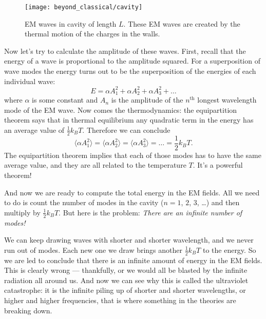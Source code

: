 \begin{figure}
\begin{center}
\texttt{[image: beyond\_classical/cavity]}
\caption{EM waves in cavity of length $L$.  These EM waves are
created by the thermal motion of the charges in the walls.}
\label{fig:cavity}
\end{center}
\end{figure}

Now let's try to calculate the amplitude of these waves.  First,
recall that the energy of a wave is proportional to the amplitude
squared.  For a superposition of wave modes the energy turns out to be
the superposition of the energies of each individual wave:
\begin{equation}
E = \alpha A_1^2 + \alpha A_2^2 + \alpha A_3^2 + \dots
\end{equation}
where $\alpha$ is some constant and $A_n$ is the amplitude of the
$n^\text{th}$ longest wavelength mode of the EM wave.  Now comes the
thermodynamics: the equipartition theorem says that in thermal
equilibrium any quadratic term in the energy has an average value of
$\textstyle\frac{1}{2}k_BT$.  Therefore we can conclude
\begin{equation}
\langle \alpha A_1^2\rangle = \langle \alpha A_2^2\rangle = 
\langle \alpha A_3^2\rangle = \dots = \frac{1}{2}k_BT.
\label{eq:EM_wave_equipartition}
\end{equation}
The equipartition theorem implies that each of those modes has
to have the same average value, and they are all related to the
temperature $T$.  It's a powerful theorem!

And now we are ready to compute the total energy in the EM fields.
All we need to do is count the number of modes in the cavity ($n=1$,
$2$, $3$, \dots) and then multiply by $\textstyle\frac{1}{2}k_BT$.  But here is
the problem: \textit{There are an infinite number of modes!}

We can keep drawing waves with shorter and shorter wavelength, and we
never run out of modes.  Each new one we draw brings another
$\textstyle\frac{1}{2}k_BT$ to the energy.  So we are led to conclude that there
is an infinite amount of energy in the EM fields.  This is clearly
wrong --- thankfully, or we would all be blasted by the infinite
radiation all around us.  And now we can see why this is called the
ultraviolet catastrophe: it is the infinite piling up of shorter and
shorter wavelengths, or higher and higher frequencies, that is where
something in the theories are breaking down.

